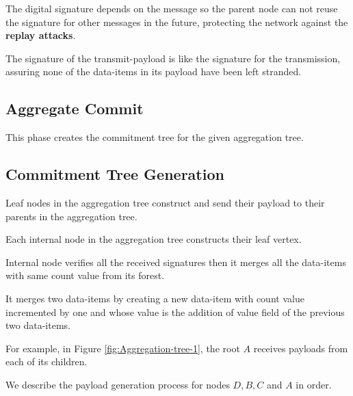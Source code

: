 \documentclass[%
  slidesonly,%
  semlayer%
  ]{seminar}                                  %
\begin{document}
\begin{slide}
      The digital signature depends on the message so the parent node can not reuse the signature for other messages in the future, protecting the network against the \textbf{replay attacks}.

      The signature of the transmit-payload is like the signature for the transmission, assuring none of the data-items in its payload have been left stranded.

      \clearpage


    \subsection*{Aggregate Commit}
      This phase creates the commitment tree for the given aggregation tree.

    \subsection*{Commitment Tree Generation}
    
      Leaf nodes in the aggregation tree construct and send their payload to their parents in the aggregation tree.  
      
      Each internal node in the aggregation tree constructs their leaf vertex.
  
      Internal node verifies all the received signatures then it merges all the data-items with same count value from its forest.

      It merges two data-items by creating a new data-item with count value incremented by one and whose value is the addition of value field of the previous two data-items. 

      For example, in Figure \ref{fig:Aggregation-tree-1}, the root $A$ receives payloads from each of its children.
        
      We describe the payload generation process for nodes $D,B,C$ and $A$ in order.
      \clearpage


\end{slide}
\end{document}
